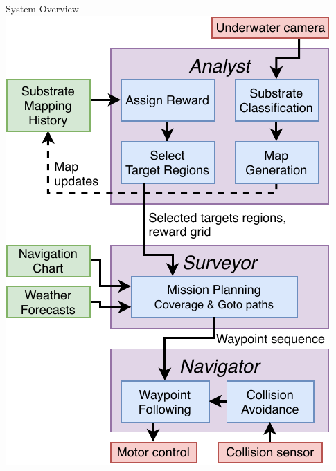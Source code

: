 \documentclass[9pt,xcolor=table]{beamer}
\begin{document}
\begin{frame}{System Overview}
    \centering
    \includegraphics[scale=0.75]{img/system.pdf}
\end{frame}
\end{document}
